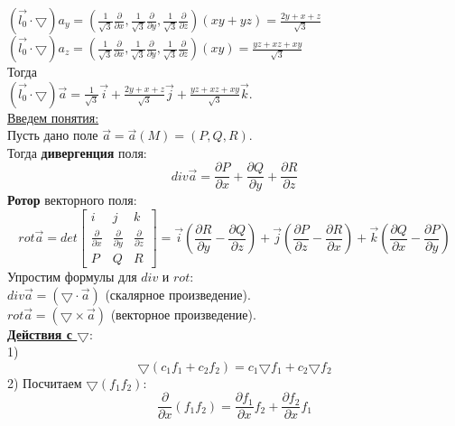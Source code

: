 \documentclass[12pt]{article}
\begin{document}
$(\overrightarrow{l_0} \cdot \bigtriangledown)a_y = (\frac{1}{\sqrt{3}} \frac{\partial}{\partial x},\frac{1}{\sqrt{3}} \frac{\partial}{\partial y},\frac{1}{\sqrt{3}} \frac{\partial}{\partial z})(xy+yz) = \frac{2y+x+z}{\sqrt{3}}$\\
$(\overrightarrow{l_0} \cdot \bigtriangledown)a_z = (\frac{1}{\sqrt{3}} \frac{\partial}{\partial x},\frac{1}{\sqrt{3}} \frac{\partial}{\partial y},\frac{1}{\sqrt{3}} \frac{\partial}{\partial z})(xy) = \frac{yz+xz+xy}{\sqrt{3}}$\\
Тогда\\
$(\overrightarrow{l_0} \cdot \bigtriangledown)\overrightarrow{a} = \frac{1}{\sqrt{3}}\overrightarrow{i} + \frac{2y+x+z}{\sqrt{3}}\overrightarrow{j} + \frac{yz+xz+xy}{\sqrt{3}}\overrightarrow{k}$.\\
\uline{Введем понятия:}\\
Пусть дано поле $\overrightarrow{a} = \overrightarrow{a}(M) = (P,Q,R)$.\\
Тогда \textbf{дивергенция} поля:\\
$$div\overrightarrow{a} = \frac{\partial P}{\partial x} + \frac{\partial Q}{\partial y} + \frac{\partial R}{\partial z}$$
\textbf{Ротор} векторного поля:\\
$$rot\overrightarrow{a} = det \begin{bmatrix} i & j & k \\ \frac{\partial}{\partial x} & \frac{\partial}{\partial y} & \frac{\partial}{\partial z} \\ P & Q & R \end{bmatrix} = \overrightarrow{i} (\frac{\partial R}{\partial y} - \frac{\partial Q}{\partial z}) + \overrightarrow{j}(\frac{\partial P}{\partial z} - \frac{\partial R}{\partial x}) + \overrightarrow{k}(\frac{\partial Q}{\partial x} - \frac{\partial P}{\partial y})$$
Упростим формулы для $div$ и $rot$:\\
$div \overrightarrow{a} = (\bigtriangledown \cdot \overrightarrow{a})$ (скалярное произведение).\\
$rot \overrightarrow{a} = (\bigtriangledown \times \overrightarrow{a})$ (векторное произведение).\\
\uline{\textbf{Действия с $\bigtriangledown$}}:\\
1) $$\bigtriangledown(c_1 f_1 + c_2 f_2) = c_1 {\bigtriangledown f_1} + c_2 {\bigtriangledown f_2}$$
2) Посчитаем $\bigtriangledown(f_1 f_2)$:\\
$$\frac{\partial}{\partial x}(f_1 f_2) = \frac{\partial f_1}{\partial x} f_2 + \frac{\partial f_2}{\partial x} f_1$$
\end{document}
